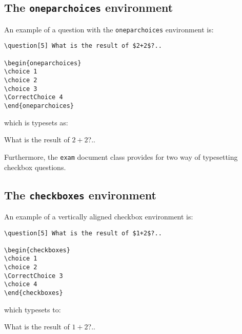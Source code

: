 \documentclass[12pt,a4paper]{exam}
\begin{document}
\subsection{The \texttt{oneparchoices} environment}

An example of a question with the \texttt{oneparchoices} environment is:

\begin{lstlisting}
\question[5] What is the result of $2+2$?..

\begin{oneparchoices}
\choice 1
\choice 2
\choice 3
\CorrectChoice 4
\end{oneparchoices}
\end{lstlisting}

which is typesets as:

\begin{questions}
\setcounter{question}{1}
\question[5] What is the result of $2+2$?..

\begin{oneparchoices}
\end{oneparchoices}
\end{questions}

Furthermore, the \texttt{exam} document class provides for two way of typesetting
checkbox questions.

\subsection{The \texttt{checkboxes} environment}

An example of a vertically aligned checkbox environment is:

\begin{lstlisting}
\question[5] What is the result of $1+2$?..

\begin{checkboxes}
\choice 1
\choice 2
\CorrectChoice 3
\choice 4
\end{checkboxes}
\end{lstlisting}

which typesets to:

\begin{questions}
\setcounter{question}{2}
\question[5] What is the result of $1+2$?..

\begin{checkboxes}
\end{checkboxes}
\end{questions}
\end{document}
